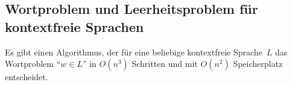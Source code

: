 




\subsection{Wortproblem und Leerheitsproblem für kontextfreie Sprachen}
\begin{Satz}[name={[Wortproblem für \acs*{CFL} entscheidbar]}]
	Es gibt einen Algorithmus, der für eine beliebige kontextfreie Sprache~$L$ das Wortproblem "`$w\in L$"' in $O(n^3)$ Schritten und mit $O(n^2)$ Speicherplatz entscheidet.
\end{Satz}

